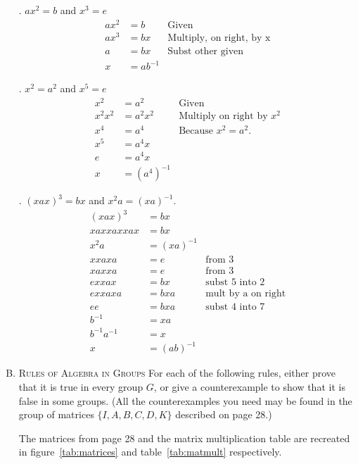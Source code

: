 \documentclass[twoside]{amsart}
\begin{document}
\begin{enumerate}[A.]
   . $ax^2=b$ and $x^3=e$
   \begin{align*}
      ax^2 & = b     & \text{Given} \\
      ax^3 & = bx    & \text{Multiply, on right, by x} \\
      a    & = bx    & \text{Subst other given} \\
      x    & = ab^{-1}
   \end{align*}

   . $x^2 = a^2$ and $x^5 = e$
   \begin{align*}
      x^2 & = a^2   & \text{Given} \\
      x^2 x^2 & = a^2 x^2 & \text{Multiply on right by $x^2$}\\
      x^4     & = a^4     & \text{Because $x^2 = a^2$.}\\
      x^5     & = a^4x \\
      e       & = a^4x \\
      x       & = (a^4)^{-1}
   \end{align*}

   . $(xax)^3 = bx$ and $x^2 a = (xa)^{-1}$.
   \begin{align}
      (xax)^3  & = bx \\
      xaxxaxxax & = bx \\
      x^2a      & = (xa)^{-1} \\
      xxaxa     & = e  & \text{from 3} \\
      xaxxa     & = e  & \text{from 3} \\
      e xxax    & = bx & \text{subst 5 into 2} \\
      exxaxa    & = bxa & \text{mult by a on right} \\
      ee        & = bxa & \text{subst 4 into 7} \\
      b^{-1}    & = xa \\
      b^{-1}a^{-1} & = x  \\
      x & = (ab)^{-1}
   \end{align}

   \item \textsc{Rules of Algebra in Groups}
   For each of the following rules, either prove that it is true in 
   every group $G$, or give a counterexample to show that it is false in 
   some groups. (All the counterexamples you need may be found in the group
   of matrices $\{I,A,B,C,D,K\}$ described on page 28.)

   The matrices from page 28 and the matrix multiplication table
   are recreated in figure~\ref{tab:matrices} and table~\ref{tab:matmult}
   respectively.


\end{enumerate}
\end{document}
